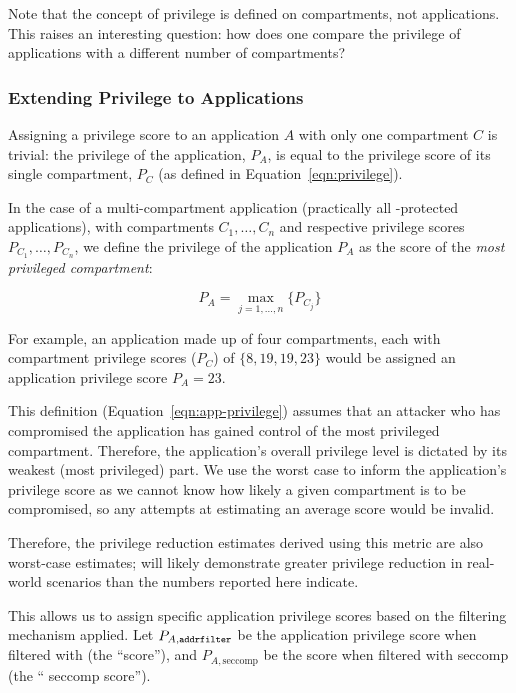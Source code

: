 Note that the concept of privilege is defined on compartments, not applications.
This raises an interesting question: how does one compare the privilege of
applications with a different number of compartments?

\subsubsection{Extending Privilege to Applications}\label{subsubsec:eval-quant-priv-apps}

Assigning a privilege score to an application $A$ with only one compartment $C
$ is trivial: the privilege of the application, $P_A$, is equal to the
privilege score of its single compartment, $P_C$ (as defined in 
Equation~\ref{eqn:privilege}). 

In the case of a multi-compartment application (practically all \af-protected
applications), with compartments $C_1, \dots, C_n$ and respective
privilege scores $P_{C_1}, \dots, P_{C_n}$, we define the privilege of the
application $P_A$ as the score of the \textit{most privileged compartment}: 

\begin{equation} \label{eqn:app-privilege} 
    P_A = \max_{j=1,\dots,n} \{ P_{C_j} \} 
\end{equation} 

For example, an application made up of four compartments, each
with compartment privilege scores ($P_C$) of $\{8, 19, 19, 23\}$ would be
assigned an application privilege score $P_A = 23$.

This definition (Equation~\ref{eqn:app-privilege}) assumes that an attacker who
has compromised the application has gained control of the most privileged
compartment. Therefore, the application's overall privilege level is
dictated by its weakest (most privileged) part. We use the worst case to
inform the application's privilege score as we cannot know how
likely a given compartment is to be compromised, so any attempts at
estimating an average score would be invalid. 

Therefore, the privilege
reduction estimates derived using this metric are also worst-case estimates;
\af will likely demonstrate greater privilege reduction in real-world
scenarios than the numbers reported here indicate. 

This allows us to assign specific application privilege scores based on the
filtering mechanism applied. Let $P_{A, \text{\texttt{addrfilter}}}$ be the application
privilege score when filtered with \af (the ``\af score''), and 
$P_{A, \text{seccomp}}$ be the score when filtered with seccomp (the ``
seccomp score'').


